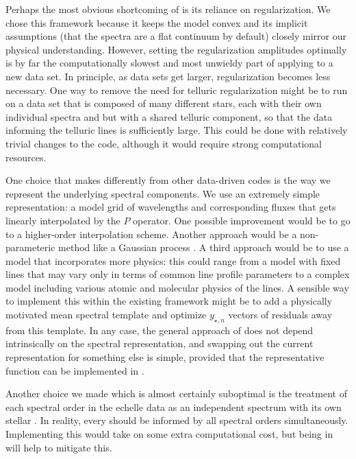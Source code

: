 \documentclass[modern]{aastex62}
\begin{document}
{Perhaps the most obvious shortcoming of \wobble is its reliance on regularization. 
We chose this framework because it keeps the model convex and its implicit assumptions (that the spectra are a flat continuum by default) closely mirror our physical understanding. 
However, setting the regularization amplitudes optimally is by far the computationally slowest and most unwieldy part of applying \wobble to a new data set. 
In principle, as data sets get larger, regularization becomes less necessary. 
One way to remove the need for telluric regularization might be to run on a data set that is composed of many different stars, each with their own individual spectra and \RVs but with a shared telluric component, so that the data informing the telluric lines is sufficiently large. 
This could be done with relatively trivial changes to the \wobble code, although it would require strong computational resources.

One choice that \wobble makes differently from other data-driven \RV codes is the way we represent the underlying spectral components. 
We use an extremely simple representation: a model grid of wavelengths and corresponding fluxes that gets linearly interpolated by the $P$ operator. 
One possible improvement would be to go to a higher-order interpolation scheme. 
Another approach would be a non-parameteric method like a Gaussian process \citep[as in][]{Czekala2017}. 
A third approach would be to use a model that incorporates more physics: this could range from a model with fixed lines that may vary only in terms of common line profile parameters to a complex model including various atomic and molecular physics of the lines. 
A sensible way to implement this within the existing \wobble framework might be to add a physically motivated mean spectral template and optimize $y_{\star, n}$ vectors of residuals away from this template. 
In any case, the general approach of \wobble does not depend intrinsically on the spectral representation, and swapping out the current representation for something else is simple, provided that the representative function can be implemented in \TF.

Another choice we made which is almost certainly suboptimal is the treatment of each spectral order in the echelle data as an independent spectrum with its own stellar \RV. 
In reality, every \RV should be informed by all spectral orders simultaneously. 
Implementing this would take on some extra computational cost, but being in \TF will help to mitigate this.

}
\end{document}
